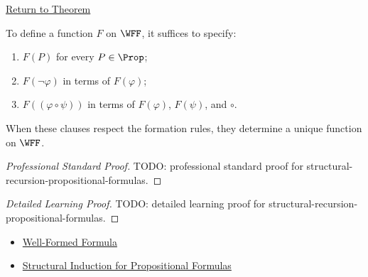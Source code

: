 \newpage
{}
\label{prf:structural-recursion-propositional-formulas}

\begin{remark*}[Return]
\hyperref[thm:structural-recursion-propositional-formulas]{Return to Theorem}
\end{remark*}

\begin{theorem*}
To define a function \(F\) on \(\WFF\), it suffices to specify:
\begin{enumerate}
\item \(F(P)\) for every \(P\in\Prop\);
\item \(F(\neg\varphi)\) in terms of \(F(\varphi)\);
\item \(F((\varphi\circ\psi))\) in terms of \(F(\varphi)\), \(F(\psi)\), and \(\circ\).
\end{enumerate}
When these clauses respect the formation rules, they determine a unique function on \(\WFF\).
\end{theorem*}

\begin{proof}[Professional Standard Proof]
\LRAProofBodyStart
TODO: professional standard proof for structural-recursion-propositional-formulas.
\end{proof}

\begin{proof}[Detailed Learning Proof]
\LRAProofBodyStart
TODO: detailed learning proof for structural-recursion-propositional-formulas.
\end{proof}

\begin{remark*}
\end{remark*}

\begin{dependencies}
\begin{itemize}
  \item \hyperref[def:well-formed-formula]{Well-Formed Formula}
  \item \hyperref[thm:structural-induction-propositional-formulas]{Structural Induction for Propositional Formulas}
\end{itemize}
\end{dependencies}

\clearpage
